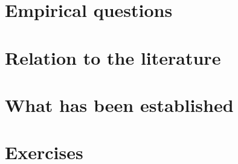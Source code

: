 
\section{Empirical questions}
\section{Relation to the literature}  %
\section{What has been established}   %
\section{Exercises}
